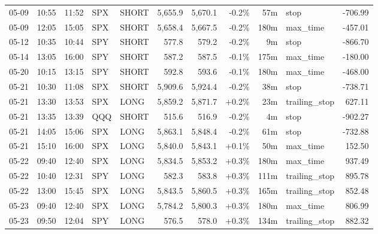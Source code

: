 \documentclass[11pt,a4paper,twoside]{article}
\begin{document}
\begin{center}
\begin{longtable}{>{\color{txtmain}}l l l l l r r r r >{\color{txtmain}}l r}
05-09 & 10:55 & 11:52 & SPX & SHORT & 5,655.9 & 5,670.1 & \textcolor{lossred}{-0.2\%} & 57m & stop & \textcolor{lossred}{-706.99} \\
05-09 & 12:05 & 15:05 & SPX & SHORT & 5,658.4 & 5,667.5 & \textcolor{lossred}{-0.2\%} & 180m & max\_time & \textcolor{lossred}{-457.01} \\
05-12 & 10:35 & 10:44 & SPY & SHORT & 577.8 & 579.2 & \textcolor{lossred}{-0.2\%} & 9m & stop & \textcolor{lossred}{-866.70} \\
05-14 & 13:05 & 16:00 & SPY & SHORT & 587.2 & 587.5 & \textcolor{lossred}{-0.1\%} & 175m & max\_time & \textcolor{lossred}{-180.00} \\
05-20 & 10:15 & 13:15 & SPY & SHORT & 592.8 & 593.6 & \textcolor{lossred}{-0.1\%} & 180m & max\_time & \textcolor{lossred}{-468.00} \\
05-21 & 10:30 & 11:08 & SPX & SHORT & 5,909.6 & 5,924.4 & \textcolor{lossred}{-0.2\%} & 38m & stop & \textcolor{lossred}{-738.71} \\
05-21 & 13:30 & 13:53 & SPX & LONG & 5,859.2 & 5,871.7 & \textcolor{wingreen}{+0.2\%} & 23m & trailing\_stop & \textcolor{wingreen}{627.11} \\
05-21 & 13:35 & 13:39 & QQQ & SHORT & 515.6 & 516.9 & \textcolor{lossred}{-0.2\%} & 4m & stop & \textcolor{lossred}{-902.27} \\
05-21 & 14:05 & 15:06 & SPX & LONG & 5,863.1 & 5,848.4 & \textcolor{lossred}{-0.2\%} & 61m & stop & \textcolor{lossred}{-732.88} \\
05-21 & 15:10 & 16:00 & SPX & LONG & 5,840.0 & 5,843.1 & \textcolor{wingreen}{+0.1\%} & 50m & max\_time & \textcolor{wingreen}{152.50} \\
05-22 & 09:40 & 12:40 & SPX & LONG & 5,834.5 & 5,853.2 & \textcolor{wingreen}{+0.3\%} & 180m & max\_time & \textcolor{wingreen}{937.49} \\
05-22 & 10:40 & 12:31 & SPY & LONG & 582.3 & 583.8 & \textcolor{wingreen}{+0.3\%} & 111m & trailing\_stop & \textcolor{wingreen}{895.78} \\
05-22 & 13:00 & 15:45 & SPX & LONG & 5,843.5 & 5,860.5 & \textcolor{wingreen}{+0.3\%} & 165m & trailing\_stop & \textcolor{wingreen}{852.48} \\
05-23 & 09:40 & 12:40 & SPX & LONG & 5,784.2 & 5,800.3 & \textcolor{wingreen}{+0.3\%} & 180m & max\_time & \textcolor{wingreen}{806.99} \\
05-23 & 09:50 & 12:04 & SPY & LONG & 576.5 & 578.0 & \textcolor{wingreen}{+0.3\%} & 134m & trailing\_stop & \textcolor{wingreen}{882.32} \\

\end{longtable}
\end{center}
\end{document}
